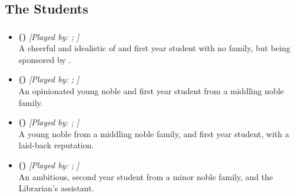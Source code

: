 \documentclass[blue]{GL2020}
\begin{document}
\subsection*{The Students}
\subsubsection*{\pFarm{}}
\begin{itemize}
	\item \textbf{\cDisney{\full} (\cDisney{\MYCharpronouns})} \textit{[Played by: \cDisney{\MYplayer}; \cDisney{\MYPlaypronouns}]}\\ A cheerful and idealistic \cDisney{\cleric} of \cFarmGod{} and first year student with no family, but being sponsored by \cWildCard{}.
	
	\item \textbf{\cAdopted{\full} (\cAdopted{\MYCharpronouns})} \textit{[Played by: \cAdopted{\MYplayer}; \cAdopted{\MYPlaypronouns}]}\\ An opinionated young noble and first year student from a middling noble family.

	\item \textbf{\cChupStudent{\full} (\cChupStudent{\MYCharpronouns})} \textit{[Played by: \cChupStudent{\MYplayer}; \cChupStudent{\MYPlaypronouns}]}\\ A young noble from a middling noble family, and first year student, with a laid-back reputation.
		
	\item \textbf{\cLibAssist{\full} (\cLibAssist{\MYCharpronouns})} \textit{[Played by: \cLibAssist{\MYplayer}; \cLibAssist{\MYPlaypronouns}]}\\ An ambitious, second year student from a minor noble family, and the Librarian's assistant.
\end{itemize}
\end{document}
